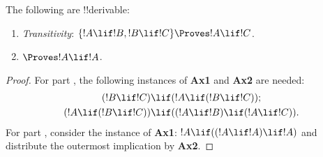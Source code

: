\documentclass[../../include/open-logic-section]{subfiles}
\begin{document}


\begin{prop}
The following are !!{derivable}:
\begin{enumerate}
\item {}
\emph{Transitivity}: $\{!A \lif !B, !B \lif !C\} \Proves
  !A \lif !C$.
\item {}
  $\Proves !A \lif !A$. 
\end{enumerate}
\end{prop}

\begin{proof}
For part , the following instances
of \textbf{Ax1} and \textbf{Ax2} are needed:
\begin{align*}
  (!B \lif !C) & \lif (!A \lif (!B \lif !C)); \\
  (!A \lif (!B \lif !C)) & \lif ((!A \lif !B) \lif
    (!A \lif !C)).
\end{align*}
For part , consider the instance of
\textbf{Ax1}: $!A \lif ((!A \lif !A) \lif
!A)$ and distribute the outermost implication by \textbf{Ax2}.
\end{proof}
\end{document}
